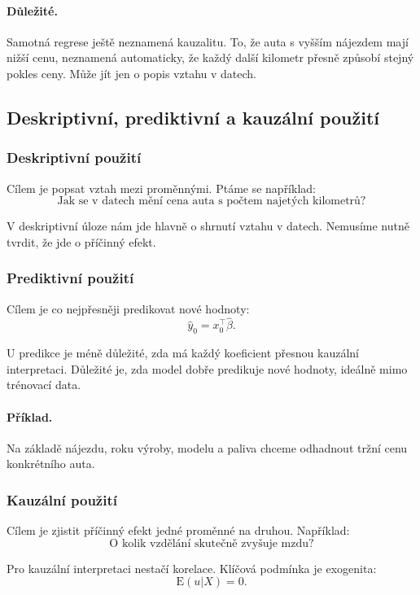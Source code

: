 \paragraph{Důležité.}
Samotná regrese ještě neznamená kauzalitu. To, že auta s vyšším nájezdem mají nižší cenu, neznamená
automaticky, že každý další kilometr přesně způsobí stejný pokles ceny. Může jít jen o popis vztahu v datech.

\subsection{Deskriptivní, prediktivní a kauzální použití}

\subsubsection{Deskriptivní použití}

Cílem je popsat vztah mezi proměnnými. Ptáme se například:
\[
\text{Jak se v datech mění cena auta s počtem najetých kilometrů?}
\]

V deskriptivní úloze nám jde hlavně o shrnutí vztahu v datech. Nemusíme nutně tvrdit, že jde o příčinný
efekt.

\subsubsection{Prediktivní použití}

Cílem je co nejpřesněji predikovat nové hodnoty:
\[
\hat y_0 = x_0^\top \hat\beta.
\]

U predikce je méně důležité, zda má každý koeficient přesnou kauzální interpretaci. Důležité je, zda model
dobře predikuje nové hodnoty, ideálně mimo trénovací data.

\paragraph{Příklad.}
Na základě nájezdu, roku výroby, modelu a paliva chceme odhadnout tržní cenu konkrétního auta.

\subsubsection{Kauzální použití}

Cílem je zjistit příčinný efekt jedné proměnné na druhou. Například:
\[
\text{O kolik vzdělání skutečně zvyšuje mzdu?}
\]

Pro kauzální interpretaci nestačí korelace. Klíčová podmínka je exogenita:
\[
\mathrm{E}(u|X)=0.
\]

